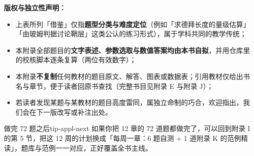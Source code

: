 \textbf{版权与独立性声明：}
\begin{itemize}
\item 上表所列「借鉴」仅指\textbf{题型分类与难度定位}（例如「求德拜长度的量级估算」「由玻姆判据讨论鞘层」这类公认的练习形式），属于学科共同的教学传统；
\item 本附录全部题目的\textbf{文字表述、参数选取与数值答案均由本书自拟}，并用仓库里的校核脚本逐条复算（两位有效数字）；
\item 本附录\textbf{不复制}任何教材的题目原文、解答、图表或数据表；引用教材仅给出书名与章节，便于读者回原书查找（完整书目见附录 E 与附录 J）；
\item 若读者发现某题与某教材的题目高度雷同，属独立命制的巧合，欢迎指出，我们会在下一版改写或补注出处。
\end{itemize}

\begin{tip}{做完 72 题之后}{tip-appl-next}
如果你把 12 章的 72 道题都做完了，可以回到附录 I 的第 5 节，把这 12 周的计划换成「每周一章：6 题自测 + 1 道附录 K 的范例精读」，题库与范例一一对应，正好覆盖全书主线。
\end{tip}
\endgroup
